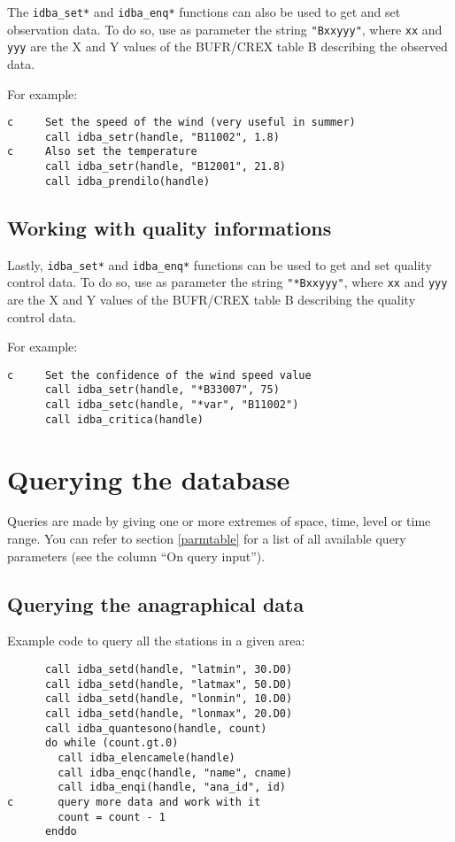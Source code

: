 \documentclass[draft,12pt,a4paper,twoside]{book}
\begin{document}
The {\tt idba\_set*} and {\tt idba\_enq*} functions can also be used to get and set
observation data.  To do so, use as parameter the string {\tt "Bxxyyy"}, where
{\tt xx} and {\tt yyy} are the X and Y values of the BUFR/CREX table B describing
the observed data.

For example:

\begin{verbatim}
c     Set the speed of the wind (very useful in summer)
      call idba_setr(handle, "B11002", 1.8)
c     Also set the temperature
      call idba_setr(handle, "B12001", 21.8)
      call idba_prendilo(handle)
\end{verbatim}


\subsection{Working with quality informations}

Lastly, {\tt idba\_set*} and {\tt idba\_enq*} functions can be used to get and set
quality control data.  To do so, use as parameter the string {\tt "*Bxxyyy"},
where {\tt xx} and {\tt yyy} are the X and Y values of the BUFR/CREX table B
describing the quality control data.

For example:

\begin{verbatim}
c     Set the confidence of the wind speed value
      call idba_setr(handle, "*B33007", 75)
      call idba_setc(handle, "*var", "B11002")
      call idba_critica(handle)
\end{verbatim}


\section {Querying the database}

Queries are made by giving one or more extremes of space, time, level or time
range.  You can refer to section \ref{parmtable} for a list of all available
query parameters (see the column ``On query input'').

\subsection {Querying the anagraphical data}

Example code to query all the stations in a given area:
\label{fun-idba_quantesono}
\label{fun-idba_elencamele}

\begin{verbatim}
      call idba_setd(handle, "latmin", 30.D0)
      call idba_setd(handle, "latmax", 50.D0)
      call idba_setd(handle, "lonmin", 10.D0)
      call idba_setd(handle, "lonmax", 20.D0)
      call idba_quantesono(handle, count)
      do while (count.gt.0)
        call idba_elencamele(handle)
        call idba_enqc(handle, "name", cname)
        call idba_enqi(handle, "ana_id", id)
c       query more data and work with it
        count = count - 1
      enddo
\end{verbatim}
\end{document}
